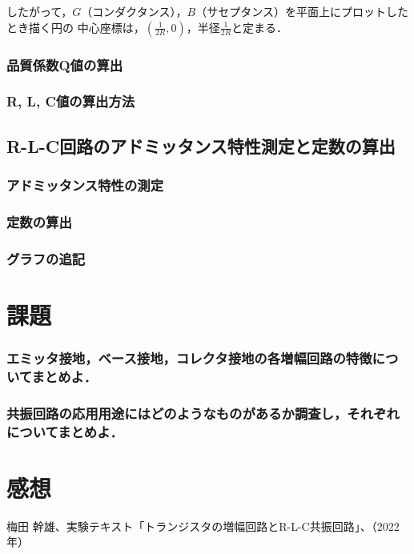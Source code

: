 \documentclass[dvipdfmx,titlepage,a4j]{jsarticle}  %
\begin{document}
したがって，$G$（コンダクタンス），$B$（サセプタンス）を平面上にプロットしたとき描く円の
中心座標は，$(\frac{1}{2R}, 0)$，半径$\frac{1}{2R}$と定まる．

\subsubsection{品質係数Q値の算出}

\subsubsection{R, L, C値の算出方法}

\subsection{R-L-C回路のアドミッタンス特性測定と定数の算出}

\subsubsection{アドミッタンス特性の測定}

\subsubsection{定数の算出}

\subsubsection{グラフの追記}

\section{課題}

\subsubsection{エミッタ接地，ベース接地，コレクタ接地の各増幅回路の特徴についてまとめよ．}

\subsubsection{共振回路の応用用途にはどのようなものがあるか調査し，それぞれについてまとめよ．}

\section{感想}

\begin{thebibliography}{99}
   梅田 幹雄、実験テキスト「トランジスタの増幅回路とR-L-C共振回路」、（2022年）
\end{thebibliography}
\end{document}
